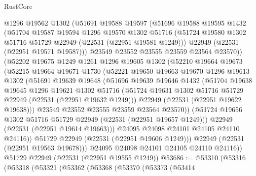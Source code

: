 \begin{lexlean}{RustCore}
\begin{coremodule}
          @1296
          @19562
          @1302
          (@51691
            @19588
            @19597
            (@51696
              @19588
              @19595
              @1432
              (@51704
                @19587
                @19594
                @1296
                @19570
                @1302
                @51716
                (@51724 @19580 @1302 @51716 @51729 @22949 (@22531 (@22951 @19581 @1249)))
                @22949
                (@22531 (@22951 @19571 @19587)))
              @23549
              @23552
              @23555
              @23559
              @23564
              @23570))
          (@52202
            @19675
            @1249
            @1261
            @1296
            @19605
            @1302
            (@52210
              @19664
              @19673
              (@52215
                @19664
                @19671
                @1730
                (@52221
                  @19650
                  @19663
                  @19670
                  @1296
                  @19613
                  @1302
                  (@51691
                    @19639
                    @19648
                    (@51696
                      @19639
                      @19646
                      @1432
                      (@51704
                        @19638
                        @19645
                        @1296
                        @19621
                        @1302
                        @51716
                        (@51724 @19631 @1302 @51716 @51729 @22949 (@22531 (@22951 @19632 @1249)))
                        @22949
                        (@22531 (@22951 @19622 @19638)))
                      @23549
                      @23552
                      @23555
                      @23559
                      @23564
                      @23570))
                  (@51724 @19656 @1302 @51716 @51729 @22949 (@22531 (@22951 @19657 @1249)))
                  @22949
                  (@22531 (@22951 @19614 @19663)))
                @24095
                @24098
                @24101
                @24105
                @24110
                @24116))
            @51729
            @22949
            (@22531 (@22951 @19606 @1249)))
          @22949
          (@22531 (@22951 @19563 @19678)))
        @24095
        @24098
        @24101
        @24105
        @24110
        @24116))
    @51729
    @22949
    (@22531 (@22951 @19555 @1249))
@53686 := @53310
    (@53316
      (@53318
        (@53321
          (@53362
            (@53368
              (@53370
                (@53373
                  (@53414

\end{coremodule}
\end{lexlean}
